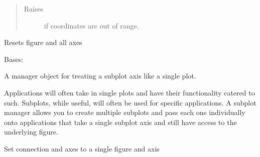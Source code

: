 \documentclass[letterpaper,10pt,english]{sphinxmanual}
\begin{document}
\begin{fulllineitems}
\begin{fulllineitems}
\begin{quote}
\begin{description}
\item[{Raises}] \leavevmode
{} \textendash{} if coordinates are out of range.

\end{description}\end{quote}

\end{fulllineitems}


\begin{fulllineitems}
\label{\detokenize{dalio.external:dalio.external.image.PySubplotGraph.reset}}
Resets figure and all axes

\end{fulllineitems}


\end{fulllineitems}


\begin{fulllineitems}
\label{\detokenize{dalio.external:dalio.external.image.SubplotManager}}
Bases: {\hyperref[\detokenize{dalio.external:dalio.external.image.PyPlotGraph}]{}}

A manager object for treating a subplot axis like a single plot.

Applications will often take in single plots and have their functionality
catered to such. Subplots, while useful, will often be used for specific
applications. A subplot manager allows you to create multiple subplots
and pass each one individually onto applications that take a single
subplot axis and still have access to the underlying figure.

\begin{fulllineitems}
\label{\detokenize{dalio.external:dalio.external.image.SubplotManager.reset}}
Set connection and axes to a single figure and axis

\end{fulllineitems}


\end{fulllineitems}
\end{document}
